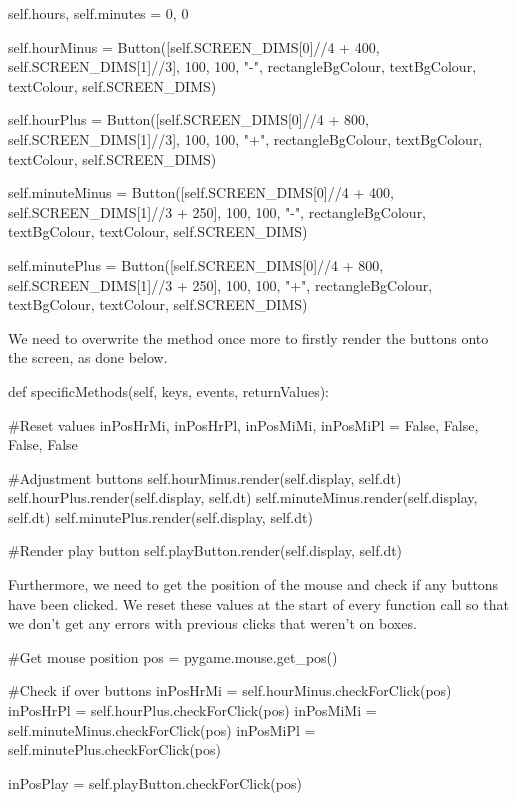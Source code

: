 \begin{mpy}
        self.hours, self.minutes = 0, 0

        self.hourMinus = Button([self.SCREEN_DIMS[0]//4 + 400, self.SCREEN_DIMS[1]//3], 100, 100, "-", rectangleBgColour, textBgColour, textColour, self.SCREEN_DIMS)
        
        self.hourPlus = Button([self.SCREEN_DIMS[0]//4 + 800, self.SCREEN_DIMS[1]//3], 100, 100, "+", rectangleBgColour, textBgColour, textColour, self.SCREEN_DIMS)
        
        self.minuteMinus = Button([self.SCREEN_DIMS[0]//4 + 400, self.SCREEN_DIMS[1]//3 + 250], 100, 100, "-", rectangleBgColour, textBgColour, textColour, self.SCREEN_DIMS)
        
        self.minutePlus = Button([self.SCREEN_DIMS[0]//4 + 800, self.SCREEN_DIMS[1]//3 + 250], 100, 100, "+", rectangleBgColour, textBgColour, textColour, self.SCREEN_DIMS)
\end{mpy}

We need to overwrite the method once more to firstly render the buttons onto the screen, as done below.

\begin{mpy}
    def specificMethods(self, keys, events, returnValues):

        #Reset values
        inPosHrMi, inPosHrPl, inPosMiMi, inPosMiPl = False, False, False, False

        #Adjustment buttons
        self.hourMinus.render(self.display, self.dt)
        self.hourPlus.render(self.display, self.dt)
        self.minuteMinus.render(self.display, self.dt)
        self.minutePlus.render(self.display, self.dt)

        #Render play button
        self.playButton.render(self.display, self.dt)
\end{mpy}

Furthermore, we need to get the position of the mouse and check if any buttons have been clicked. We reset these values at the start of every function call so that we don't get any errors with previous clicks that weren't on boxes.

\begin{mpy}
        #Get mouse position
        pos = pygame.mouse.get_pos()

        #Check if over buttons
        inPosHrMi = self.hourMinus.checkForClick(pos)
        inPosHrPl = self.hourPlus.checkForClick(pos)
        inPosMiMi = self.minuteMinus.checkForClick(pos)
        inPosMiPl = self.minutePlus.checkForClick(pos)

        inPosPlay = self.playButton.checkForClick(pos)
\end{mpy}

